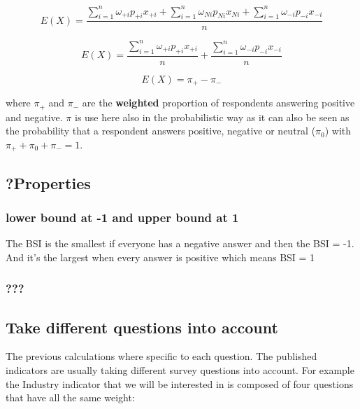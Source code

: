 \documentclass[12pt,a4paper,oneside]{book}
\begin{document}
\begin{equation}
    E(X) = \frac{ \sum_{i=1}^n \omega_{+i} p_{+i} x_{+i} + \sum_{i=1}^n \omega_{Ni} p_{Ni} x_{Ni} + \sum_{i=1}^n \omega_{-i} p_{-i} x_{-i}}{n}
\end{equation} 

\begin{equation}
    E(X) = \frac{ \sum_{i=1}^n \omega_{+i} p_{+i} x_{+i}}{n} + \frac{\sum_{i=1}^n \omega_{-i} p_{-i} x_{-i}}{n}
\end{equation} 


\begin{equation}
    E(X) = \pi_+ - \pi_-
\end{equation}

where $\pi_+$ and $\pi_-$ are the \textbf{weighted} proportion of respondents answering positive and negative. $\pi$ is use here also in the probabilistic way as it can also be seen as the probability that a respondent answers positive, negative or neutral ($\pi_0$) with $\pi_+ + \pi_0 + \pi_- =1$.




\subsection{?Properties}

\subsubsection{lower bound at -1 and upper bound at 1}

The BSI is the smallest if everyone has a negative answer and then the BSI = -1. 
And it's the largest when every answer is positive which means BSI = 1

\subsubsection{???}




\subsection{Take different questions into account}

The previous calculations where specific to each question. The published indicators are usually taking different survey questions into account. For example the Industry indicator that we will be interested in is composed of four questions that have all the same weight:
\end{document}
